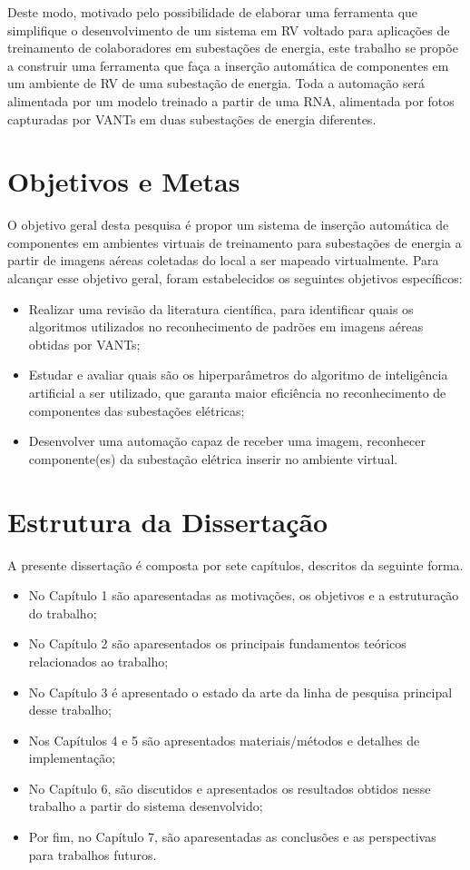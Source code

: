 Deste modo, motivado pelo possibilidade de elaborar uma ferramenta que simplifique o desenvolvimento de um sistema em RV voltado para aplicações de treinamento de colaboradores em subestações de energia, este trabalho se propõe a construir uma ferramenta que faça a inserção automática de componentes em um ambiente de RV de uma subestação de energia. Toda a automação será alimentada por um modelo treinado a partir de uma RNA, alimentada por fotos capturadas por VANTs em duas subestações de energia diferentes.

\section{Objetivos e Metas}

O objetivo geral desta pesquisa é propor um sistema de inserção automática de componentes em ambientes virtuais de treinamento para subestações de energia a partir  de imagens aéreas coletadas do local a ser mapeado virtualmente. Para alcançar esse objetivo geral, foram estabelecidos os seguintes objetivos específicos:

\begin{itemize}
\item Realizar uma revisão da literatura científica, para identificar quais os algoritmos utilizados no reconhecimento de padrões em imagens aéreas obtidas por VANTs;
\item Estudar e avaliar quais são os hiperparâmetros do algoritmo de inteligência artificial a ser utilizado, que garanta maior eficiência no reconhecimento de componentes das subestações elétricas;
\item Desenvolver uma automação capaz de receber uma imagem, reconhecer componente(es) da subestação elétrica inserir no ambiente virtual.
\end{itemize}

\section{Estrutura da Dissertação}

A presente dissertação é composta por sete capítulos, descritos da seguinte forma.
\begin{itemize}
\item No Capítulo 1 são aparesentadas as motivações, os objetivos e a estruturação do trabalho;
\item No Capítulo 2 são aparesentados os principais fundamentos teóricos relacionados ao trabalho;
\item No Capítulo 3 é apresentado o estado da arte da linha de pesquisa principal desse trabalho;
\item Nos Capítulos 4 e 5 são apresentados materiais/métodos e detalhes de implementação;
\item No Capítulo 6, são discutidos e apresentados os resultados obtidos nesse trabalho a partir do sistema desenvolvido;
\item Por fim, no Capítulo 7, são aparesentadas as conclusões e as perspectivas para trabalhos futuros.
\end{itemize}